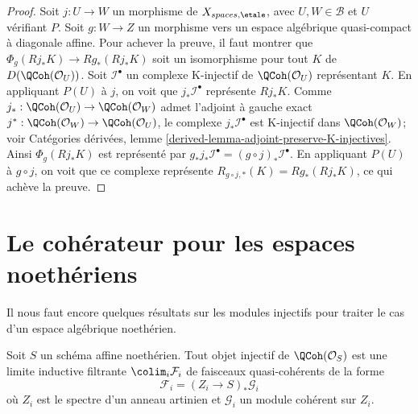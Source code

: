 \begin{proof}
\medskip\noindent
Soit $j : U \to W$ un morphisme de $X_{spaces, \etale}$, avec
$U,W \in \mathcal{B}$ et $U$ v\'erifiant $P$. Soit $g : W \to Z$ un
morphisme vers un espace alg\'ebrique quasi-compact \`a diagonale affine.
Pour achever la preuve, il faut montrer que
$\Phi_g(Rj_*K) \to Rg_*(Rj_*K)$
soit un isomorphisme pour tout $K$ de $D(\QCoh(\mathcal{O}_U))$.
Soit $\mathcal{I}^\bullet$ un complexe K-injectif de
$\QCoh(\mathcal{O}_U)$ repr\'esentant $K$. En appliquant $P(U)$ \`a $j$, on
voit que $j_*\mathcal{I}^\bullet$ repr\'esente $Rj_*K$. Comme
$j_* : \QCoh(\mathcal{O}_U) \to \QCoh(\mathcal{O}_W)$ admet l'adjoint \`a
gauche exact $j^* : \QCoh(\mathcal{O}_W) \to \QCoh(\mathcal{O}_U)$, le
complexe $j_*\mathcal{I}^\bullet$ est K-injectif dans
$\QCoh(\mathcal{O}_W)$; voir Cat\'egories d\'eriv\'ees, lemme
\ref{derived-lemma-adjoint-preserve-K-injectives}. Ainsi
$\Phi_g(Rj_*K)$ est repr\'esent\'e par
$g_*j_*\mathcal{I}^\bullet = (g \circ j)_*\mathcal{I}^\bullet$.
En appliquant $P(U)$ \`a $g \circ j$, on voit que ce complexe repr\'esente
$R_{g \circ j, *}(K) = Rg_*(Rj_*K)$, ce qui ach\`eve la preuve.
\end{proof}









\section{Le coh\'erateur pour les espaces noeth\'eriens}
\label{section-coherator-Noetherian}

\noindent
Il nous faut encore quelques r\'esultats sur les modules injectifs pour traiter
le cas d'un espace alg\'ebrique noeth\'erien.

\begin{lemma}
\label{lemma-affine-injective-colimit-direct-sum-pushforwards-artin}
Soit $S$ un sch\'ema affine noeth\'erien. Tout objet injectif de
$\QCoh(\mathcal{O}_S)$ est une limite inductive filtrante
$\colim_i \mathcal{F}_i$ de faisceaux quasi-coh\'erents de la forme
$$
\mathcal{F}_i = (Z_i \to S)_*\mathcal{G}_i
$$
o\`u $Z_i$ est le spectre d'un anneau artinien et $\mathcal{G}_i$ un module
coh\'erent sur $Z_i$.
\end{lemma}

